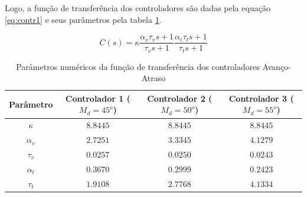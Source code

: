 \documentclass{article}
\begin{document}
Logo, a função de transferência dos controladores são dadas pela equação \ref{eq:contr1} e seus parâmetros pela tabela \ref{tab:contr}.

\begin{equation}
\label{eq:contr}
C(s)=\kappa \frac{\alpha_v \tau_v s + 1}{\tau_v s + 1} \frac{\alpha_t \tau_t s + 1}{\tau_t s + 1}
\end{equation}

\begin{table}[H]
	\centering
	\caption{Parâmetros numéricos da função de transferência dos controladores Avanço-Atraso}
	\label{tab:contr}
	\begin{tabular}{|c|c|c|c|}
		\hline Parâmetro & Controlador 1 ($M_d = 45^o$)& Controlador 2 ($M_d = 50^o$)& Controlador 3 ($M_d = 55^o$)\\ 
		\hline $\kappa$ & $8.8445$ & $8.8445$ & $8.8445$\\ 
		\hline $\alpha_v$ & $2.7251$ & $3.3345$ & $4.1279$\\ 
		\hline $\tau_v$ & $0.0257$ & $0.0250$ & $0.0243$\\ 
		\hline $\alpha_t$ & $0.3670$ & $0.2999$ & $0.2423$\\ 
		\hline $\tau_t$ & $1.9108$ & $2.7768$ & $4.1334$\\ 
		\hline 
	\end{tabular} 
\end{table}
\end{document}
